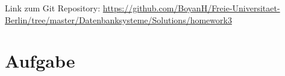 \usepackage{graphicx}
\usepackage{fancyvrb}

\newcommand{\dozent}{Prof. Dr. Agn`es Voisard, Nicolas Lehmann}					%
\newcommand{\tutor}{Nicolas Lehmann}						%
\newcommand{\tutoriumNo}{10}				%
\newcommand{\projectNo}{4}									%
\newcommand{\veranstaltung}{Datenbanksysteme}	%
\newcommand{\semester}{SoSe 2017}						%
\newcommand{\studenten}{Boyan Hristov, Julian Habib}			%





Link zum Git Repository: \url{https://github.com/BoyanH/Freie-Universitaet-Berlin/tree/master/Datenbanksysteme/Solutions/homework3}

\section{Aufgabe}


